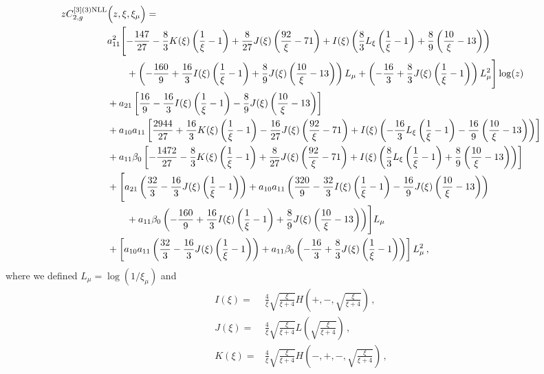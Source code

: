 \documentclass[a4paper]{article}
\begin{document}
\begin{align}
		z C_{2,g}^{[3](3) \rm NLL}&\Bigl(z,\xi,\xi_\mu\Bigr)= \notag \\
		& a_{11}^2\Biggl[-\frac{147}{27} - \frac{8}{3} K(\xi) \left(\frac{1}{\xi}-1\right) + \frac{8}{27} J(\xi) \left(\frac{92}{\xi} - 71\right) + I(\xi) \left(\frac{8}{3} L_\xi \left(\frac{1}{\xi}-1\right) + \frac{8}{9} \left(\frac{10}{\xi} - 13\right)\right) \notag\\
		& \qquad + \left(-\frac{160}{9} + \frac{16}{3} I(\xi) \left(\frac{1}{\xi}-1\right) + \frac{8}{9} J(\xi) \left(\frac{10}{\xi} - 13\right)\right) L_\mu + \left(-\frac{16}{3} + \frac{8}{3} J(\xi) \left(\frac{1}{\xi}-1\right)\right) L_\mu^2\Biggr] \log(z) \notag\\
		& + a_{21} \left[\frac{16}{9} - \frac{16}{3} I(\xi) \left(\frac{1}{\xi}-1\right) - \frac{8}{9} J(\xi) \left(\frac{10}{\xi} - 13\right)\right] \notag\\
		& + a_{10} a_{11} \left[\frac{2944}{27} + \frac{16}{3} K(\xi) \left(\frac{1}{\xi}-1\right) - \frac{16}{27} J(\xi) \left(\frac{92}{\xi} - 71\right) + I(\xi) \left(-\frac{16}{3} L_\xi \left(\frac{1}{\xi}-1\right) - \frac{16}{9} \left(\frac{10}{\xi} - 13\right)\right)\right] \notag\\
		& + a_{11} \beta_0 \left[-\frac{1472}{27} - \frac{8}{3} K(\xi) \left(\frac{1}{\xi}-1\right) + \frac{8}{27} J(\xi) \left(\frac{92}{\xi} - 71\right) + I(\xi) \left(\frac{8}{3} L_\xi \left(\frac{1}{\xi}-1\right) + \frac{8}{9} \left(\frac{10}{\xi} - 13\right)\right)\right] \notag\\
		& + \Biggl[a_{21} \left(\frac{32}{3} - \frac{16}{3} J(\xi) \left(\frac{1}{\xi}-1\right) \right) + a_{10} a_{11} \left(\frac{320}{9} - \frac{32}{3} I(\xi) \left(\frac{1}{\xi}-1\right) - \frac{16}{9} J(\xi) \left(\frac{10}{\xi} - 13\right)\right) \notag\\
		& \qquad+ a_{11} \beta_0 \left(-\frac{160}{9} + \frac{16}{3} I(\xi) \left(\frac{1}{\xi}-1\right) + \frac{8}{9} J(\xi) \left(\frac{10}{\xi} - 13\right)\right) \Biggr] L_\mu \notag\\
		& + \left[ a_{10} a_{11} \left(\frac{32}{3} - \frac{16}{3} J(\xi) \left(\frac{1}{\xi}-1 \right)\right) + a_{11} \beta_0 \left(-\frac{16}{3} + \frac{8}{3} J(\xi) \left(\frac{1}{\xi}-1\right)\right)\right] L_\mu^2\,, \label{C2_g3}
\end{align}
\endgroup
where we defined $L_\mu = \log\left(1/\xi_\mu\right)$ and
\begin{equation}
	\begin{split}
    I(\xi)=&\frac{4}{\xi}\sqrt{\frac{\xi}{\xi+4}}H \left(+,-,\sqrt{\frac{\xi}{\xi+4}}\right)\,, \\
    J(\xi)=&\frac{4}{\xi}\sqrt{\frac{\xi}{\xi+4}}L\left(\sqrt{\frac{\xi}{\xi+4}}\right)\,, \\
    K(\xi)=&\frac{4}{\xi}\sqrt{\frac{\xi}{\xi+4}}H\left(-,+,-,\sqrt{\frac{\xi}{\xi+4}}\right)\,,
	\end{split}
\end{equation}
\end{document}
